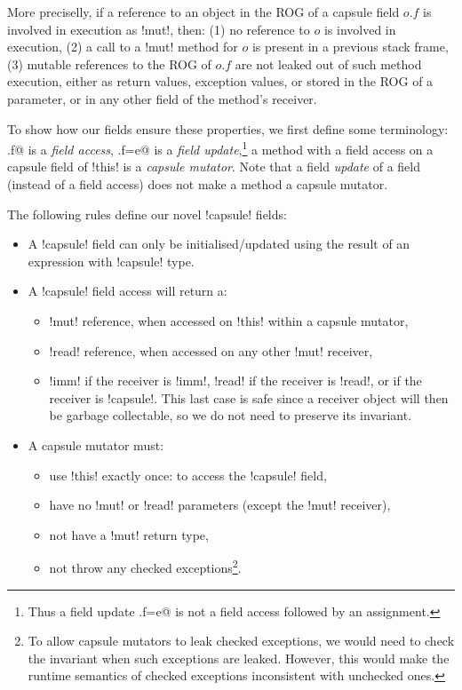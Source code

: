 More preciselly, if a reference to an object in the ROG of a capsule field $o.f$ is involved in execution as \Q!mut!, then:
(1) no reference to $o$ is involved in execution,
(2) a call to a \Q!mut! method for $o$ is present in a previous stack frame,
(3) mutable references to the ROG of $o.f$ are not leaked out of such method execution, either as return values, exception values, or stored in the ROG of a parameter, or in any other field of the method's receiver.


To show how our \Q@capsule@ fields ensure these properties, we first define some terminology:
\Q@x.f@ is a \emph{field access}, \Q@x.f=e@ is a \emph {field update},\footnote{Thus a field update \Q@x.f=e@ is not a field access followed by an assignment.}
a \Q@mut@ method with a field access on a capsule field of \Q!this! is a \emph{capsule mutator}. 
Note that a field \emph{update} of a \Q@capsule@ field (instead of a field access) does not make a method a capsule mutator.

The following rules define our novel \Q!capsule! fields:
\begin{itemize}
\item A \Q!capsule! field can only be initialised/updated using the result of an expression with  \Q!capsule! type.
\item A \Q!capsule! field access will return a:
\begin{itemize}
\item \Q!mut! reference, when accessed on \Q!this! within a capsule mutator,
\item \Q!read! reference, when accessed on any other \Q!mut! receiver,
\item \Q!imm! if the receiver is \Q!imm!, \Q!read! if the receiver is \Q!read!, or \Q@capsule@ if the receiver is
\Q!capsule!. This last case is safe since a \Q@capsule@ receiver object will then be garbage collectable, so we do not need to preserve its invariant.
\end{itemize}
\item A capsule mutator must:
\begin{itemize}
\item use \Q!this! exactly once: to access the \Q!capsule! field,
\item have no \Q!mut! or \Q!read! parameters (except the \Q!mut! receiver),
\item not have a \Q!mut! return type,
\item not throw any checked exceptions\footnote{To allow capsule mutators to leak checked exceptions, we would need to check the invariant when such exceptions are leaked. However, this would make the runtime semantics of checked exceptions inconsistent with unchecked ones.}.
\end{itemize}
\end{itemize}	

